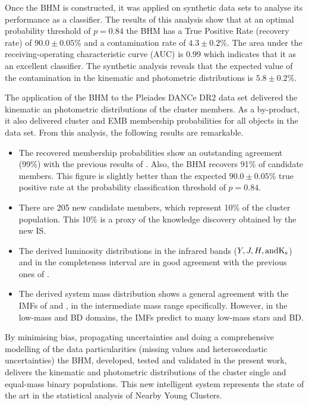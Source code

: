 Once the BHM is constructed, it was applied on synthetic data sets to analyse its performance as a classifier. The results of this analysis show that at an optimal probability threshold of $p=0.84$ the BHM has a True Positive Rate (recovery rate) of $90.0\pm0.05$\% and a contamination rate of $4.3\pm0.2$\%. The area under the receiving-operating characteristic curve (AUC) is 0.99 which indicates that it as an excellent classifier. The synthetic analysis reveals that the expected value of the contamination in the kinematic and photometric distributions is $5.8\pm 0.2$\%.
  
The application of the BHM to the Pleiades DANCe DR2 data set delivered the kinematic an photometric distributions of the cluster members. As a by-product, it also delivered cluster and EMB membership probabilities for all objects in the data set. From this analysis, the following results are remarkable.

\begin{itemize}
\item The recovered membership probabilities show an outstanding agreement (99\%) with the previous results of \citet{Bouy2015}. Also, the BHM recovers 91\% of \citet{Rebull2016} candidate members. This figure is slightly better than the expected $90.0\pm0.05$\% true positive rate at the probability classification threshold of $p=0.84$.
\item There are 205 new candidate members, which represent 10\% of the cluster population. This 10\% is a proxy of the knowledge discovery obtained by the new IS.
\item The derived luminosity distributions in the infrared bands ($Y,J,H, \rm{and} K_s$) and in the completeness interval are in good agreement with the previous ones of \citet{Bouy2015}.
\item The derived system mass distribution \cite[using an age of 120 Myr and the BT-Settl isochrone model of][]{Allard2012} shows a general agreement with the IMFs of \citet{Chabrier2005} and \citet{Thies2007}, in the intermediate mass range specifically. However, in the low-mass and BD domains, the IMFs predict to many low-mass stars and BD. 
\end{itemize}

By minimising bias, propagating uncertainties and doing a comprehensive modelling of the data particularities (missing values and heteroscedastic uncertainties) the BHM, developed, tested and validated in the present work, delivers the kinematic and photometric distributions of the cluster single and equal-mass binary populations. This new intelligent system represents the state of the art in the statistical analysis of Nearby Young Clusters.

